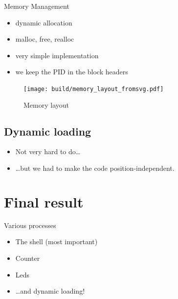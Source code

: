 \documentclass{beamer}
\begin{document}
    \begin{frame}{Memory Management}
      \begin{itemize}
        \item dynamic allocation
        \item malloc, free, realloc
        \item very simple implementation
        \item we keep the PID in the block headers
      \end{itemize}
    \end{frame}

    \begin{frame}
      \begin{figure}
        \begin{minipage}[c]{0.5\textwidth}
          \caption{Memory layout}
        \end{minipage}\hfill
        \begin{minipage}[c]{0.5\textwidth}
          \texttt{[image: build/memory\_layout\_fromsvg.pdf]}
        \end{minipage}
      \end{figure}
    \end{frame}

    \subsection{Dynamic loading}
      \begin{frame}
        \begin{itemize}
          \item Not very hard to do\dots
          \item \dots but we had to make the code position-independent.
        \end{itemize}
      \end{frame}

  \section{Final result}
    \begin{frame}{Various processes}
      \begin{itemize}
        \item The shell (most important)
        \item Counter
        \item Leds
        \item \dots and dynamic loading!
      \end{itemize}
    \end{frame}
\end{document}
